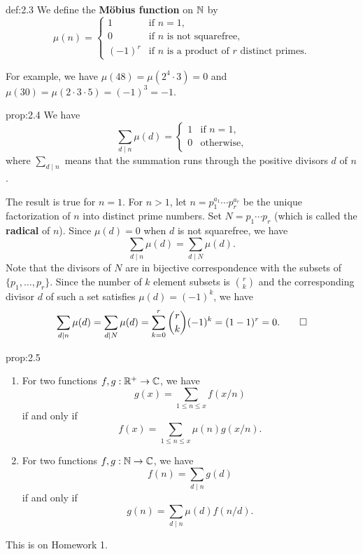 \begin{defn}{def:2.3}
We define the {\bf M\"obius function} on $\mathbb{N}$ by 
\[ \mu(n) = \begin{cases} 1 & \text{if } n = 1, \\ 0 & \text{if $n$ is not squarefree,} \\ 
(-1)^r & \text{if $n$ is a product of $r$ distinct primes.} \end{cases} \]
\end{defn}
For example, we have $\mu(48) = \mu(2^4 \cdot 3) = 0$ and $\mu(30) = \mu(2 \cdot 3 \cdot 5) = 
(-1)^3 = -1$. 

\begin{prop}{prop:2.4}
We have 
\[ \sum_{d \mid n} \mu(d) = \begin{cases} 1 & \text{if } n = 1, \\ 0 & \text{otherwise,} \end{cases} \]
where $\sum_{d\mid n}$ means that the summation runs through the positive divisors $d$ of $n$. 
\end{prop}
\begin{pf}
The result is true for $n = 1$. For $n > 1$, let $n = p_1^{a_1} \cdots p_r^{a_r}$ be the unique 
factorization of $n$ into distinct prime numbers. Set $N = p_1 \cdots p_r$ (which is called the 
{\bf radical} of $n$). Since $\mu(d) = 0$ when $d$ is not squarefree, we have 
\[ \sum_{d\mid n} \mu(d) = \sum_{d\mid N} \mu(d). \]
Note that the divisors of $N$ are in bijective correspondence with the subsets of $\{p_1, \dots, p_r\}$. 
Since the number of $k$ element subsets is $\binom{r}{k}$ and the corresponding divisor $d$ of such 
a set satisfies $\mu(d) = (-1)^k$, we have 
\[ \sum_{d \mid n} \mu(d) = \sum_{d \mid N} \mu(d) = \sum_{k=0}^r \binom rk (-1)^k = (1-1)^r = 0. \qedhere \]
\end{pf}

\begin{prop}{prop:2.5}
\begin{enumerate}[(1)]
    \item For two functions $f, g : \mathbb{R}^+ \to \mathbb{C}$, we have 
    \[ g(x) = \sum_{1 \leq n \leq x} f(x/n) \]
    if and only if 
    \[ f(x) = \sum_{1 \leq n \leq x} \mu(n) g(x/n). \]
    \item For two functions $f, g : \mathbb{N} \to \mathbb{C}$, we have 
    \[ f(n) = \sum_{d \mid n} g(d) \]
    if and only if 
    \[ g(n) = \sum_{d \mid n} \mu(d) f(n/d). \]
\end{enumerate}
\end{prop}
\begin{pf}
This is on Homework 1.
\end{pf}

